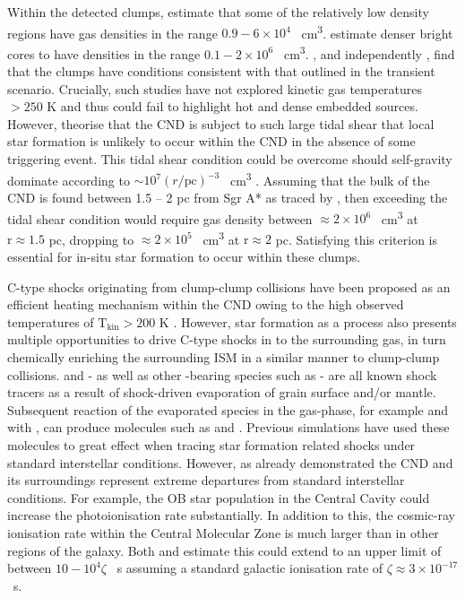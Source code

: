 \documentclass[twocolumn]{aastex631}
\begin{document}
Within the detected clumps, \citet{tsuboiCNR} estimate that some of the relatively low density regions have gas densities in the range $0.9 - 6\times10^{4}$ \si{\per\centi\meter\cubed}. \citet{sgrAHCN} estimate denser  bright cores to have densities in the range $0.1 - 2\times10^{6}$ \si{\per\centi\meter\cubed}. \citet{sgrAHCN}, and independently \citet{sgrAHCN2}, find that the  clumps have conditions consistent with that outlined in the transient scenario. Crucially, such studies have not explored kinetic gas temperatures $> 250$ \si{\kelvin} and thus could fail to highlight hot and dense embedded sources. However, \citet{sgrAHCN} theorise that the CND is subject to such large tidal shear that local star formation is unlikely to occur within the CND in the absence of some triggering event. This tidal shear condition could be overcome should self-gravity dominate according to $\sim 10^{7}(r/\mathrm{pc})^{-3}$ \si{\per\centi\meter\cubed} \citep{sgra_bp_flows}. Assuming that the bulk of the CND is found between 1.5 -- 2 pc from Sgr A* as traced by  \citep{Christopher2005}, then exceeding the tidal shear condition would require gas density between $ \approx 2 \times 10^{6}$ \si{\per\centi\meter\cubed} at $\mathrm{r} \approx 1.5$ pc, dropping to $ \approx 2 \times 10^{5}$ \si{\per\centi\meter\cubed} at $\mathrm{r} \approx 2$ pc. Satisfying this criterion is essential for in-situ star formation to occur within these clumps. 

C-type shocks originating from clump-clump collisions have been proposed as an efficient heating mechanism within the CND owing to the high observed temperatures of $\mathrm{T_{kin}} > 200$ \si{\kelvin} \citep{warmCNDGas, chemicalFeaturesCND}. However, star formation as a process also presents multiple opportunities to drive C-type shocks in to the surrounding gas, in turn chemically enriching the surrounding ISM in a similar manner to clump-clump collisions.  and  - as well as other -bearing species such as  - are all known shock tracers \citep{SiOShockTracer,sulphurShockTracer} as a result of shock-driven evaporation of grain surface and/or mantle. Subsequent reaction of the evaporated species in the gas-phase, for example  and  with , can produce molecules such as  and . Previous simulations \citep{SiOShockTracer,cjShocksFlower,UCLCHEM,jShocks} have used these molecules to great effect when tracing star formation related shocks under standard interstellar conditions.  However, as already demonstrated the CND and its surroundings represent extreme departures from standard interstellar conditions. For example, the OB star population in the Central Cavity could increase the photoionisation rate substantially. In addition to this, the cosmic-ray ionisation rate within the Central Molecular Zone is much larger than in other regions of the galaxy. Both \citet{sgrACRIRUL} and \citet{sgrACRIRLL} estimate this could extend to an upper limit of between $10 - 10^{4}\zeta$ \si{\per\second} assuming a standard galactic ionisation rate of $\zeta \approx 3 \times 10^{-17}$ \si{\per\second}. 
 
\end{document}
